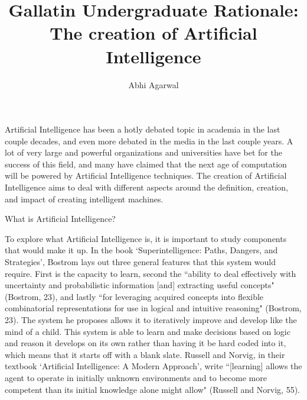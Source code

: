 \documentclass[11pt]{article}
\title{Gallatin Undergraduate Rationale: The creation of Artificial Intelligence}
\author{Abhi Agarwal}
\date{}
\begin{document}
\maketitle


\par Artificial Intelligence has been a hotly debated topic in academia in the last couple decades, and even more debated in the media in the last couple years. A lot of very large and powerful organizations and universities have bet for the success of this field, and many have claimed that the next age of computation will be powered by Artificial Intelligence techniques. The creation of Artificial Intelligence aims to deal with different aspects around the definition, creation, and impact of creating intelligent machines.\\
\begin{center}
	{\large What is Artificial Intelligence?\par}
\end{center}
\par To explore what Artificial Intelligence is, it is important to study components that would make it up. In the book `Superintelligence: Paths, Dangers, and Strategies', Bostrom lays out three general features that this system would require. First is the capacity to learn, second the ``ability to deal effectively with uncertainty and probabilistic information [and] extracting useful concepts" (Bostrom, 23), and lastly ``for leveraging acquired concepts into flexible combinatorial representations for use in logical and intuitive reasoning" (Bostrom, 23). The system he proposes allows it to iteratively improve and develop like the mind of a child. This system is able to learn and make decisions based on logic and reason it develops on its own rather than having it be hard coded into it, which means that it starts off with a blank slate. Russell and Norvig, in their textbook `Artificial Intelligence: A Modern Approach', write ``[learning] allows the agent to operate in initially unknown environments and to become more competent than its initial knowledge alone might allow" (Russell and Norvig, 55).
\end{document}
